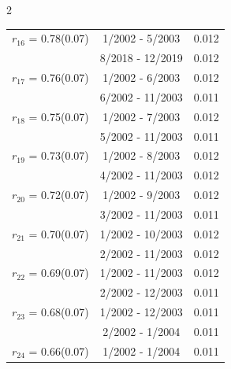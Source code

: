 \begin{multicols}{2}
{\begin{tabular}{ccc}
  $r_{16}$ = 0.78(0.07) &       1/2002 -  5/2003 &        0.012   \vspace{-.10in} \\  
&        8/2018 - 12/2019 &        0.012  \vspace{-.02in} \\ \hline 
  $r_{17}$ = 0.76(0.07) &       1/2002 -  6/2003 &        0.012   \vspace{-.10in} \\  
&        6/2002 - 11/2003 &        0.011  \vspace{-.02in} \\ \hline 
  $r_{18}$ = 0.75(0.07) &       1/2002 -  7/2003 &        0.012   \vspace{-.10in} \\  
&        5/2002 - 11/2003 &        0.011  \vspace{-.02in} \\ \hline 
  $r_{19}$ = 0.73(0.07) &       1/2002 -  8/2003 &        0.012   \vspace{-.10in} \\  
&        4/2002 - 11/2003 &        0.012  \vspace{-.02in} \\ \hline 
  $r_{20}$ = 0.72(0.07) &       1/2002 -  9/2003 &        0.012   \vspace{-.10in} \\  
&        3/2002 - 11/2003 &        0.011  \vspace{-.02in} \\ \hline 
  $r_{21}$ = 0.70(0.07) &       1/2002 - 10/2003 &        0.012   \vspace{-.10in} \\  
&        2/2002 - 11/2003 &        0.012  \vspace{-.02in} \\ \hline 
  $r_{22}$ = 0.69(0.07) &       1/2002 - 11/2003 &        0.012   \vspace{-.10in} \\  
&        2/2002 - 12/2003 &        0.011  \vspace{-.02in} \\ \hline 
  $r_{23}$ = 0.68(0.07) &       1/2002 - 12/2003 &        0.011   \vspace{-.10in} \\  
&        2/2002 -  1/2004 &        0.011  \vspace{-.02in} \\ \hline 
  $r_{24}$ = 0.66(0.07) &       1/2002 -  1/2004 &        0.011   \vspace{-.10in} \\  

\end{tabular}}
\end{multicols}
